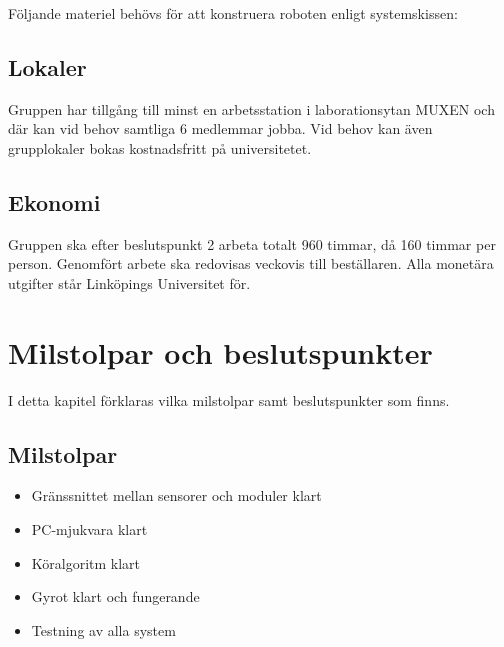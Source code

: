 \documentclass[a4paper,11pt]{article}
\begin{document}
Följande materiel behövs för att konstruera roboten enligt systemskissen:
%
%	

\subsection{Lokaler}
Gruppen har tillgång till minst en arbetsstation i laborationsytan MUXEN och där kan vid behov samtliga 6 medlemmar jobba. Vid behov kan även grupplokaler bokas kostnadsfritt på universitetet.

\subsection{Ekonomi}
Gruppen ska efter beslutspunkt 2 arbeta totalt 960 timmar, då 160 timmar per person. Genomfört arbete ska redovisas veckovis till beställaren. Alla monetära utgifter står Linköpings Universitet för.

\section{Milstolpar och beslutspunkter}
I detta kapitel förklaras vilka milstolpar samt beslutspunkter som finns.

\subsection{Milstolpar}
\begin{itemize}
	\item Gränssnittet mellan sensorer och moduler klart
	\item PC-mjukvara klart
	\item Köralgoritm klart
	\item Gyrot klart och fungerande
	\item Testning av alla system
\end{itemize}
\end{document}
